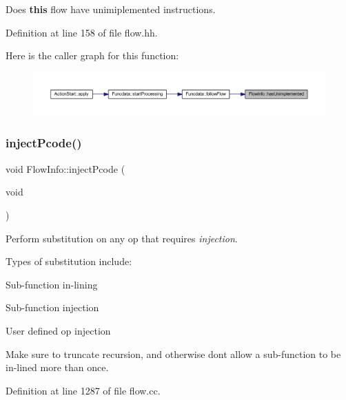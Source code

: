 Does {\bfseries{this}} flow have unimiplemented instructions. 



Definition at line 158 of file flow.\+hh.

Here is the caller graph for this function\+:
\nopagebreak
\begin{figure}[H]
\begin{center}
\leavevmode
\includegraphics[width=350pt]{class_flow_info_ab18097b31e5b59b13075742866790dde_icgraph}
\end{center}
\end{figure}
\mbox{\label{class_flow_info_af91718ae694b4852c24f4af6cb0b07a0}} 
\subsubsection{\texorpdfstring{injectPcode()}{injectPcode()}}
{\footnotesize\ttfamily void Flow\+Info\+::inject\+Pcode (\begin{DoxyParamCaption}\item[{void}]{ }\end{DoxyParamCaption})}



Perform substitution on any op that requires {\itshape injection}. 

Types of substitution include\+:
\begin{DoxyItemize}
\item Sub-\/function in-\/lining
\item Sub-\/function injection
\item User defined op injection
\end{DoxyItemize}

Make sure to truncate recursion, and otherwise don\textquotesingle{}t allow a sub-\/function to be in-\/lined more than once. 

Definition at line 1287 of file flow.\+cc.

